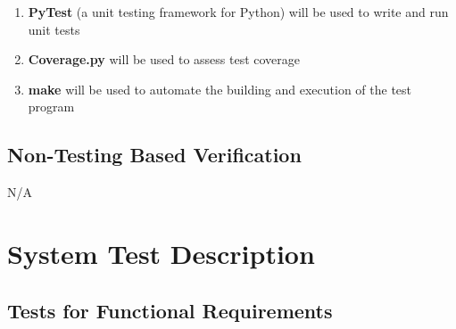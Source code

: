 \documentclass[12pt, titlepage]{article}
\begin{document}
\begin{enumerate}
\item {\bf PyTest} (a unit testing framework for Python) will be used to write 
  and run unit tests
\item {\bf Coverage.py} will be used to assess test coverage
\item {\bf make} will be used to automate the building and execution of the test 
  program
\end{enumerate}



\subsection{Non-Testing Based Verification}
N/A

\section{System Test Description}

\subsection{Tests for Functional Requirements}
\end{document}
